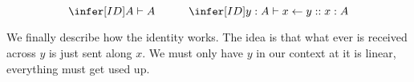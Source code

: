 \documentclass{article}
\begin{document}
\[
\infer[{ID}]
    {A \vdash A}
    {  }
\hspace{3em}   
\infer[{ID}]
    { y:A \vdash x \leftarrow y :: x : A}
    { }
\]

We finally describe how the identity works. The idea is that what ever is received across \(y\) is just sent along \(x\). We must only have \(y\) in our context at it is linear, everything must get used up. 
	
	
	
	
	
	
	
	
	
\end{document}
